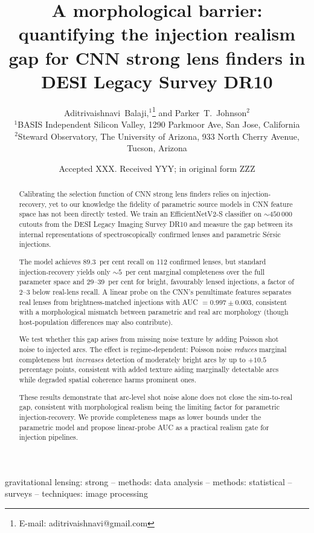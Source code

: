 \documentclass[fleqn,usenatbib]{mnras}
\title[Injection realism gap for CNN lens finding]{A morphological barrier: quantifying the injection realism gap for CNN strong lens finders in DESI Legacy Survey DR10}
\author[Balaji \& Johnson]{
Aditrivaishnavi~Balaji,$^{1}$\thanks{E-mail: aditrivaishnavi@gmail.com}
and Parker~T.~Johnson$^{2}$
\\
$^{1}$BASIS Independent Silicon Valley, 1290 Parkmoor Ave, San Jose, California\\
$^{2}$Steward Observatory, The University of Arizona, 933 North Cherry Avenue, Tucson, Arizona
}
\date{Accepted XXX. Received YYY; in original form ZZZ}
\begin{document}
\label{firstpage}
\pagerange{\pageref{firstpage}--\pageref{lastpage}}
\maketitle

\begin{abstract}
Calibrating the selection function of CNN strong lens finders relies on injection-recovery, yet to our knowledge the fidelity of parametric source models in CNN feature space has not been directly tested.  We train an EfficientNetV2-S classifier on $\sim\!450\,000$ cutouts from the DESI Legacy Imaging Survey DR10 and measure the gap between its internal representations of spectroscopically confirmed lenses and parametric S\'{e}rsic injections.

The model achieves $89.3$~per cent recall on 112 confirmed lenses, but standard injection-recovery yields only $\sim\!5$~per cent marginal completeness over the full parameter space and $29$--$39$~per cent for bright, favourably lensed injections, a factor of $2$--$3$ below real-lens recall.  A linear probe on the CNN's penultimate features separates real lenses from brightness-matched injections with AUC $= 0.997 \pm 0.003$, consistent with a morphological mismatch between parametric and real arc morphology (though host-population differences may also contribute).

We test whether this gap arises from missing noise texture by adding Poisson shot noise to injected arcs.  The effect is regime-dependent: Poisson noise \emph{reduces} marginal completeness but \emph{increases} detection of moderately bright arcs by up to $+10.5$ percentage points, consistent with added texture aiding marginally detectable arcs while degraded spatial coherence harms prominent ones.

These results demonstrate that arc-level shot noise alone does not close the sim-to-real gap, consistent with morphological realism being the limiting factor for parametric injection-recovery.  We provide completeness maps as lower bounds under the parametric model and propose linear-probe AUC as a practical realism gate for injection pipelines.
\end{abstract}

\begin{keywords}
gravitational lensing: strong -- methods: data analysis -- methods: statistical -- surveys -- techniques: image processing
\end{keywords}
\end{document}
